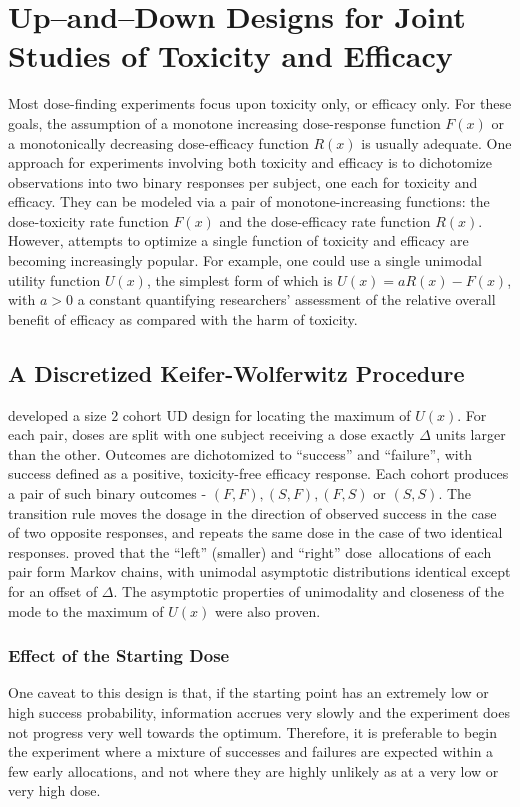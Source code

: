 \chapter{Up--and--Down Designs for Joint Studies of Toxicity and Efficacy }

Most dose-finding experiments focus upon toxicity only, or efficacy only. For these goals, the assumption of a monotone increasing dose-response function $F(x)$ or a monotonically decreasing dose-efficacy function $R(x)$ is usually adequate.
One approach for experiments involving both toxicity and efficacy is to dichotomize observations into two binary responses per subject, one each for toxicity and efficacy. They can be modeled via a pair of monotone-increasing functions: the dose-toxicity rate function $F(x)$ and the dose-efficacy rate function $R(x)$.
However, attempts to optimize a single function of toxicity and efficacy are becoming increasingly popular.  For example, one could use a single unimodal utility function $U(x)$, the simplest form of which is $U(x)=aR(x)-F(x)$, with $a>0$ a constant quantifying researchers' assessment of the relative overall benefit of efficacy as compared with the harm of toxicity.

\section{A Discretized Keifer-Wolferwitz Procedure}
\cite{Kpam:Flou:opti:2001} developed a size $2$ cohort UD design for locating the maximum of $U(x)$. For each pair, doses are split with one subject receiving a dose  exactly $\Delta$ units larger than the other. Outcomes are dichotomized to ``success'' and ``failure'', with success defined as a positive, toxicity-free efficacy response. Each cohort produces a pair of such binary outcomes - $(F,F),(S,F),(F,S)$ or $(S,S)$. The transition rule moves the dosage in the direction of observed success in the case of two opposite responses, and repeats the same dose in the case of two identical responses. \cite{Kpam:Flou:opti:2008} proved that the ``left'' (smaller) and ``right'' dose~allocations of each pair form Markov chains, with unimodal asymptotic distributions identical except for an offset of $\Delta$. The asymptotic properties of unimodality and closeness of the mode to the maximum of $U(x)$ were also proven.

\subsection{Effect of the Starting Dose}
One caveat to this design is that, if the starting point has an extremely low or high success probability, information accrues very slowly and the experiment does not progress very well towards the optimum. Therefore, it is preferable to begin the experiment where a mixture of successes and failures are expected within a few early allocations, and not where they are highly unlikely as at a very low or  very high dose.

